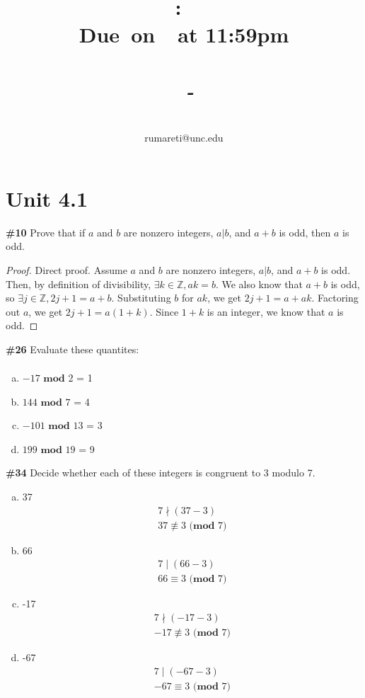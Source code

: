 \documentclass{article}
\title{
    \vspace{2in}
    \textmd{\textbf{\hmwkClass:\ \hmwkTitle}}\\
    \normalsize\vspace{0.1in}\small{\textbf{Due\ on\ \hmwkDueDate\ at 11:59pm}}\\
    \normalsize\text{Tuesday/Thursday 11:00-12:15, Phillips 383}\\
    \vspace{0.1in}\large{\textit{\hmwkClassInstructor\ - \hmwkClassTime}}
    \vspace{3in}
}
\author{\hmwkAuthorName\\\small{rumareti@unc.edu}}
\date{}
\newcommand{\unit}[1]{\section{Unit #1}}
\newcommand{\problem}[1]{\textbf{\##1}}
\newcommand{\prob}[1]{\problem{#1}}
\newcommand{\AllIntegers}{\mathbb{Z}}
\renewcommand{\pmod}[1]{\textbf{ (mod }#1)}
\begin{document}
\maketitle

\pagebreak

\unit{4.1}
\prob{10}
Prove that if \(a\) and \(b\) are nonzero integers, \(a | b\), and \(a + b\) is odd, then \(a\) is odd.
\begin{proof}
    Direct proof. Assume \(a\) and \(b\) are nonzero integers, \(a | b\), and \(a + b\) is odd. Then, by definition of divisibility, \(\exists k \in \AllIntegers, ak = b\). We also know that \(a + b\) is odd, so \(\exists j \in \AllIntegers, 2j + 1 = a + b\). Substituting \(b\) for \(ak\), we get \(2j + 1 = a + ak\). Factoring out \(a\), we get \(2j + 1 = a(1 + k)\). Since \(1 + k\) is an integer, we know that \(a\) is odd.
\end{proof}
\pagebreak
\prob{26}
Evaluate these quantites:
\begin{align*}
\end{align*}
\begin{enumerate}[a)]
    \item \(-17 \textbf{ mod } 2\) = \hspace{12pt} 1
    \item \(144 \textbf{ mod } 7\) = \hspace{14pt} 4
    \item \(-101 \textbf{ mod } 13\) = \hspace{5pt}3
    \item \(199 \textbf{ mod } 19\) = \hspace{9pt} 9
\end{enumerate}
\pagebreak
\prob{34}
Decide whether each of these integers is congruent to 3 modulo 7.
\begin{enumerate}[a)]
    \item 37
    \begin{align*}
        7 \nmid (37 - 3)\\
        37 \not\equiv 3 \pmod{7}
    \end{align*}
    \item 66
    \begin{align*}
        7 \mid (66 - 3)\\
        66 \equiv 3 \pmod{7}
    \end{align*}
    \item -17
    \begin{align*}
        7 \nmid (-17 - 3)\\
        -17 \not\equiv 3 \pmod{7}
    \end{align*}
    \item -67
    \begin{align*}
        7 \mid (-67 - 3)\\
        -67 \equiv 3 \pmod{7}
    \end{align*}
\end{enumerate}
\end{document}
